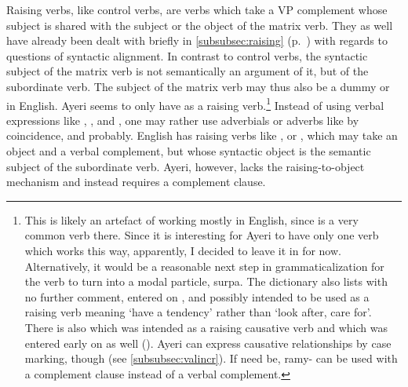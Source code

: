 Raising verbs, like control verbs, are verbs which take a VP complement whose
subject is shared with the subject or the object of the matrix verb. They as
well have already been dealt with briefly in \autoref{subsubsec:raising}
(p.~\pageref{subsubsec:raising}) with regards to questions of syntactic
alignment. In contrast to control verbs, the syntactic subject of the matrix
verb is not semantically an argument of it, but of the subordinate verb. The
subject of the matrix verb may thus also be a dummy  or  in
English. Ayeri seems to only have  as a raising
verb.\footnote{This is likely an artefact of working mostly in English, since
 is a very common verb there. Since it is interesting for Ayeri to
have only one verb which works this way, apparently, I decided to leave it in
for now. Alternatively, it would be a reasonable next step in
grammaticalization for the verb to turn into a modal particle, 
{surpa}. The dictionary also lists  with no further
comment, entered on , and possibly intended to be used as a
raising verb meaning `have a tendency' rather than `look after, care for'.
There is also  which was intended as a
raising causative verb and which was entered early on as well
(). Ayeri can express causative relationships by case
marking, though (see \autoref{subsubsec:valincr}). If need be, 
{ramy-} can be used with a complement clause instead of a verbal complement.}
Instead of using verbal expressions like , , and , one may rather use adverbials or adverbs like 
{by coincidence},  and 
{probably}. English has raising verbs like ,  or
, which may take an object and a verbal complement, but whose
syntactic object is the semantic subject of the subordinate verb. Ayeri,
however, lacks the raising-to-object mechanism and instead requires a
complement clause.

